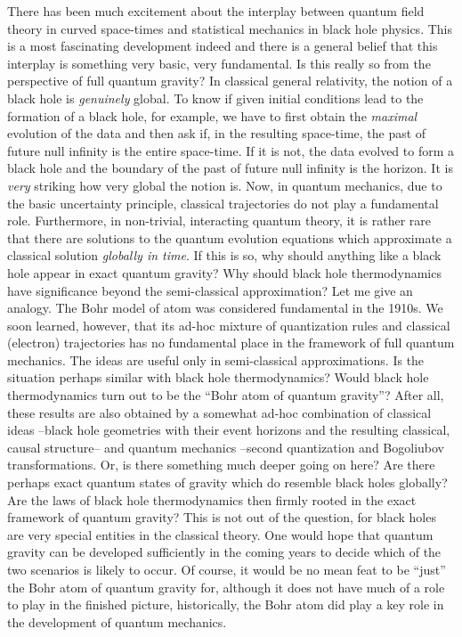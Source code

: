 There has been much excitement about the interplay between quantum field
theory in curved space-times and statistical mechanics in black hole physics.
This is a most fascinating development indeed and there is a general belief
that this interplay is something very basic, very fundamental. Is this really
so from the perspective of full quantum gravity? In classical general
relativity, the notion of a black hole is {\it genuinely} global. To know if
given initial conditions lead to the formation of a black hole, for example,
we have to first obtain the {\it maximal} evolution of the data and then
ask if, in the resulting space-time, the past of future null infinity is
the entire space-time. If it is not, the data evolved to form a black hole
and the boundary of the past of future null infinity is the horizon. It is
{\it very} striking how very global the notion is. Now, in quantum mechanics,
due to the basic uncertainty principle, classical trajectories do not play
a fundamental role. Furthermore, in non-trivial, interacting quantum theory,
it is rather rare that there are solutions to the quantum evolution equations
which approximate a classical solution {\it globally in time}. If this is so,
why should anything like a black hole appear in exact quantum gravity? Why
should black hole thermodynamics have significance beyond the semi-classical
approximation? Let me give an analogy. The Bohr model of atom was considered
fundamental in the 1910s. We soon learned, however, that its
ad-hoc mixture of quantization rules and classical (electron)
trajectories has no fundamental place in the framework of full quantum
mechanics. The ideas are useful only in semi-classical approximations. Is
the situation perhaps similar with black hole thermodynamics? Would
black hole thermodynamics turn out to be the ``Bohr atom of quantum
gravity''? After all, these results are also obtained by a somewhat ad-hoc
combination of classical ideas --black hole geometries with their event
horizons and the resulting classical, causal structure-- and quantum
mechanics --second quantization and Bogoliubov transformations. Or, is
there something much deeper going on here? Are there perhaps exact quantum
states of gravity which do resemble black holes globally? Are the laws
of black hole thermodynamics then firmly rooted in the exact framework
of quantum gravity? This is not out of the question, for black holes are
very special entities in the classical theory. One would hope that quantum
gravity can be developed sufficiently in the coming years to decide which of
the two scenarios is likely to occur. Of course, it would be no mean feat
to be ``just'' the Bohr atom of quantum gravity for, although it does not have
much of a role to play in the finished picture, historically, the Bohr atom
did play a key role in the development of quantum mechanics.

